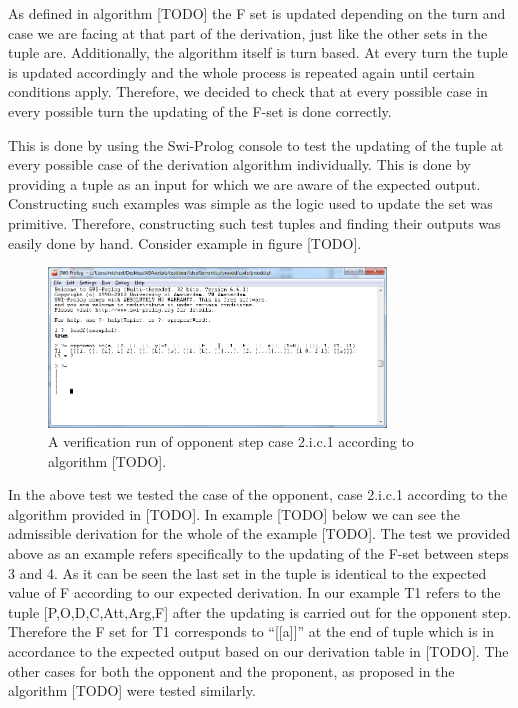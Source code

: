 As defined in algorithm [TODO] the F set is updated  depending on the turn and case we are facing at that part of the derivation, just like the other sets in the tuple are. Additionally, the algorithm itself is turn based. At every turn the tuple is updated accordingly and the whole process is repeated again until certain conditions apply. Therefore, we decided to check that at every possible case in every possible turn the updating of the F-set is done correctly.

This is done by using the Swi-Prolog console to test the updating of the tuple at every possible case of the derivation algorithm individually. This is done by providing a tuple as an input for which we are aware of the expected output. Constructing such examples was simple as the logic used to update the  set was primitive. Therefore, constructing such test tuples and finding their outputs was easily done by hand. Consider example in figure [TODO]. 

\clearpage

\begin{figure}[h]
    \centering
    \includegraphics[width=0.8\textwidth]{swiFsetStep.png}
    \caption{A verification run of opponent step case 2.i.c.1 according to algorithm [TODO].}
    \label{fig:arg_swi_ideal_step}
\end{figure}

In the above test we tested the case of the opponent, case 2.i.c.1 according to the algorithm provided in [TODO]. In example [TODO] below we can see the admissible derivation for the whole of the example [TODO]. The test we provided above as an example refers specifically to the updating of the F-set between steps 3 and 4. As it can be seen the last set in the tuple is identical to the expected value of F according to our expected derivation. In our example T1 refers to the tuple [P,O,D,C,Att,Arg,F] after the updating is carried out for the opponent step. Therefore the F set for T1 corresponds to ``[[a]]'' at the end of tuple which is in accordance to the expected output based on our derivation table in [TODO]. The other cases for both the opponent and the proponent, as proposed in the algorithm [TODO] were tested similarly.

